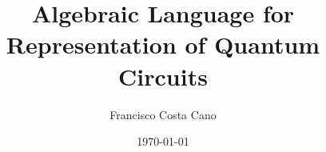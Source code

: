 \documentclass[a4paper,onecolumn,superscriptaddress,unpublished,draft,allowfontchageintitle]{quantumarticle}
\begin{document}
	\title{Algebraic Language for Representation of Quantum Circuits}
	\date{\today}
	\author{Francisco Costa Cano}

	
	\tableofcontents
	\maketitle

	
	
	
	
	
	
	
	
	
	\printbibliography
\end{document}
